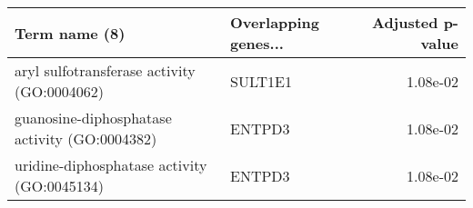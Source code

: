 \begin{tabular}{llr}
\toprule
                                Term name (8) & Overlapping genes... &  Adjusted p-value \\
\midrule
  aryl sulfotransferase activity (GO:0004062) &              SULT1E1 &          1.08e-02 \\
guanosine-diphosphatase activity (GO:0004382) &               ENTPD3 &          1.08e-02 \\
  uridine-diphosphatase activity (GO:0045134) &               ENTPD3 &          1.08e-02 \\
\bottomrule
\end{tabular}
